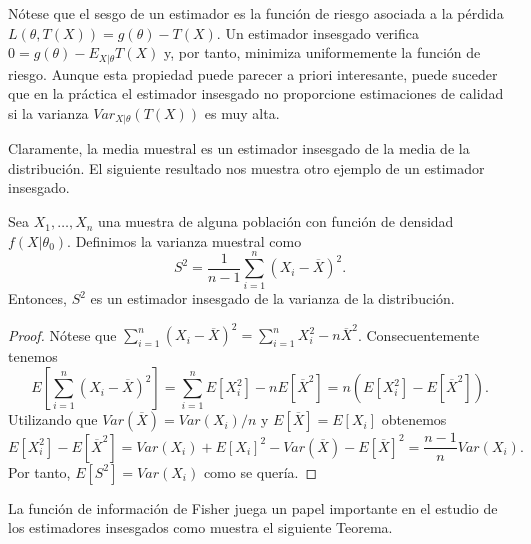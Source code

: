 \documentclass{article}
\begin{document}
    Nótese que el sesgo de un estimador es la función de riesgo asociada a la pérdida $L(\theta,T(X)) = g(\theta) - T(X)$. Un estimador insesgado verifica $0 = g(\theta) - E_{X|\theta} T(X)$ y, por tanto, minimiza uniformemente la función de riesgo. Aunque esta propiedad puede parecer a priori interesante, puede suceder que en la práctica el estimador insesgado no proporcione estimaciones de calidad si la varianza $Var_{X|\theta}(T(X))$ es muy alta.

    Claramente, la media muestral es un estimador insesgado de la media de la distribución. El siguiente resultado nos muestra otro ejemplo de un estimador insesgado.

    \begin{prop}
        Sea $X_1, \ldots, X_n$ una muestra de alguna población con función de densidad $f(X | \theta_0)$. Definimos la varianza muestral como
        \[S^2 = \frac{1}{n-1}\sum_{i = 1}^n(X_i - \overline{X})^2.\]
        Entonces, $S^2$ es un estimador insesgado de la varianza de la distribución.
    \end{prop}
    \begin{proof}
        Nótese que $\sum_{i = 1}^n(X_i - \overline{X})^2 = \sum_{i = 1}^nX_i^2 - n\overline{X}^2$. Consecuentemente tenemos
        \[E\left[\sum_{i = 1}^n(X_i - \overline{X})^2\right] = \sum_{i = 1}^nE\left[X_i^2\right] -     nE[\overline{X}^2] = n(E\left[X_i^2\right] - E[\overline{X}^2]).\]
        Utilizando que $Var(\overline{X}) = Var(X_i) / n$ y $E[\overline{X}] = E[X_i]$ obtenemos
        \[E[X_i^2] - E[\overline{X}^2] = Var(X_i) + E[X_i]^2 - Var(\overline{X}) - E[\overline{X}]^2 = \frac{n-1}{n} Var(X_i).\]
        Por tanto, $E[S^2] = Var(X_i)$ como se quería.
    \end{proof}

    La función de información de Fisher juega un papel importante en el estudio de los estimadores insesgados como muestra el siguiente Teorema.
\end{document}
